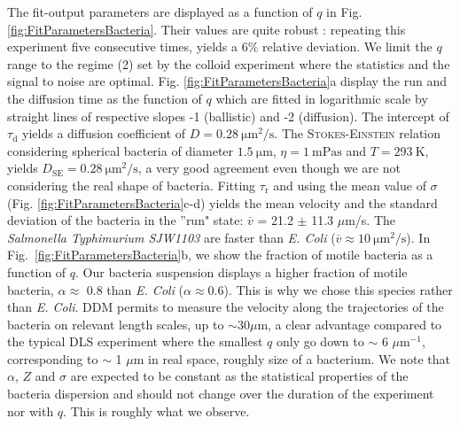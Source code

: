 \documentclass[prb,twocolumn,amsmath,amssymb]{revtex4-1}
\newcommand{\tgn}[1]{{\color{blue}#1}} %
\begin{document}
The fit-output parameters are displayed as a function of $q$ in Fig. \ref{fig:FitParametersBacteria}. \tgn{Their values are quite robust : repeating this experiment five consecutive times, yields a 6\% relative deviation.} We limit the $q$ range to the regime (2) set by the colloid experiment where the statistics and the signal to noise are optimal. Fig. \ref{fig:FitParametersBacteria}a display the run and the diffusion time as the function of $q$ which are fitted in logarithmic scale by straight lines of respective slopes -1 (ballistic) and -2 (diffusion). The intercept of $\tau_\text{d}$ yields a diffusion coefficient of  $D = \SI{0.28}{\micro\meter\squared\per\second}$. The \textsc{Stokes-Einstein} relation considering spherical bacteria of diameter $\SI{1.5}{\micro\meter}$, $\eta = \SI{1}{\milli\pascal\second}$ and $T=\SI{293}{\kelvin}$, yields $D_\text{SE} = \SI{0.28}{\micro\meter\squared\per\second}$, a very good agreement even though we are not considering the real shape of bacteria. Fitting $\tau_\text{r}$ and using the mean value of $\sigma$ (Fig. \ref{fig:FitParametersBacteria}c-d) yields the mean velocity and the standard deviation of the bacteria in the ''run" state: $\overline{v}$ = 21.2 $\pm$ 11.3 $\mu$m/s. The \textit{Salmonella Typhimurium SJW1103}  are faster than \textit{E. Coli} ($\overline{v} \approx \SI{10}{\micro\meter\squared\per\second}$)\cite{4_Martinez20121637}. In Fig.~\ref{fig:FitParametersBacteria}b, we show the fraction of motile bacteria as a function of $q$. Our bacteria suspension displays a higher fraction of motile bacteria, $\alpha\approx$ 0.8 than \textit{E. Coli} ($\alpha\approx 0.6$)\cite{4_Martinez20121637}. This is why we chose this species rather than \textit{E. Coli}. DDM permits to measure the velocity along the trajectories of the bacteria on relevant length scales, up to $\sim 30 \mu$m, a clear advantage compared to the typical DLS experiment where the smallest $q$ only go down to $\sim$ 6 $\mu$m$^{-1}$, corresponding to $\sim$ 1 $\mu$m in real space, roughly size of a bacterium. We note that $\alpha$, $Z$ and $\sigma$ are expected to be constant as the statistical properties of the bacteria dispersion and should not change over the duration of the experiment nor with $q$. This is roughly what we observe. 

\end{document}
